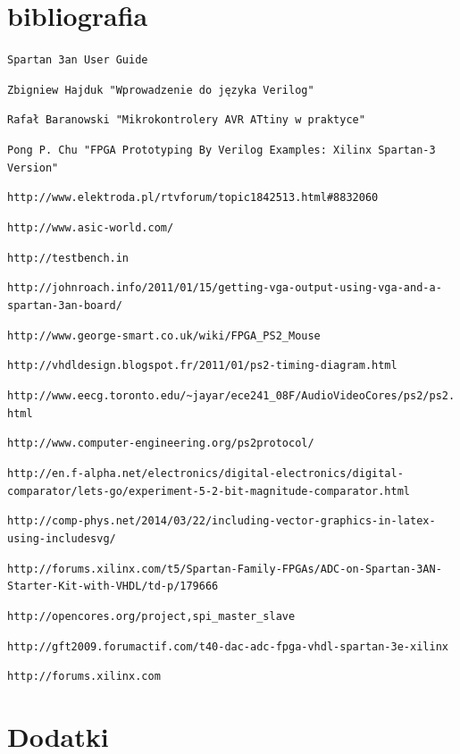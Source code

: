 \documentclass[a4paper,12pt]{article}
\begin{document}
\section{bibliografia}
\begin{description}
	\item \verb|Spartan 3an User Guide|
	\item \verb|Zbigniew Hajduk "Wprowadzenie do języka Verilog"|
	\item \verb|Rafał Baranowski "Mikrokontrolery AVR ATtiny w praktyce"|
	\item \verb|Pong P. Chu "FPGA Prototyping By Verilog Examples: Xilinx Spartan-3 Version"|
	\item \verb|http://www.elektroda.pl/rtvforum/topic1842513.html#8832060|
	\item \verb|http://www.asic-world.com/|
	\item \verb|http://testbench.in|
	\item \verb|http://johnroach.info/2011/01/15/getting-vga-output-using-vga-and-a-spartan-3an-board/|
	\item \verb|http://www.george-smart.co.uk/wiki/FPGA_PS2_Mouse|
	\item \verb|http://vhdldesign.blogspot.fr/2011/01/ps2-timing-diagram.html|
	\item \verb|http://www.eecg.toronto.edu/~jayar/ece241_08F/AudioVideoCores/ps2/ps2.html|
	\item \verb|http://www.computer-engineering.org/ps2protocol/|
	\item \verb|http://en.f-alpha.net/electronics/digital-electronics/digital-comparator/lets-go/experiment-5-2-bit-magnitude-comparator.html|
	\item \verb|http://comp-phys.net/2014/03/22/including-vector-graphics-in-latex-using-includesvg/|
	\item \verb|http://forums.xilinx.com/t5/Spartan-Family-FPGAs/ADC-on-Spartan-3AN-Starter-Kit-with-VHDL/td-p/179666|
	\item \verb|http://opencores.org/project,spi_master_slave|
	\item \verb|http://gft2009.forumactif.com/t40-dac-adc-fpga-vhdl-spartan-3e-xilinx|
	\item \verb|http://forums.xilinx.com|
\end{description}

\newpage

\section{Dodatki}
\end{document}
